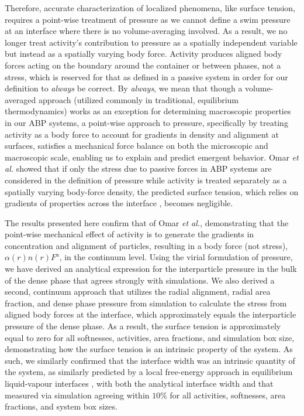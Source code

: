 \documentclass[twoside,twocolumn,9pt]{article}
\begin{document}
Therefore, accurate characterization of localized phenomena, like surface tension, requires a point-wise treatment of pressure as we cannot define a swim pressure at an interface where there is no volume-averaging involved. As a result, we no longer treat activity's contribution to pressure as a spatially independent variable but instead as a spatially varying body force. Activity produces aligned body forces acting on the boundary around the container or between phases, not a stress, which is reserved for that as defined in a passive system in order for our definition to \textit{always} be correct. By \textit{always}, we mean that though a volume-averaged approach (utilized commonly in traditional, equilibrium thermodynamics) works as an exception \cite{Solon2015a} for determining macroscopic properties in our ABP systems, a point-wise approach to pressure, specifically by treating activity as a body force to account for gradients in density and alignment at surfaces, satisfies a mechanical force balance on both the microscopic and macroscopic scale, enabling us to explain and predict emergent behavior. Omar \textit{et al.} showed that if only the stress due to passive forces in ABP systems are considered in the definition of pressure while activity is treated separately as a spatially varying body-force density, the predicted surface tension, which relies on gradients of properties across the interface \cite{Navascues1979}, becomes negligible. 

The results presented here confirm that of Omar \textit{et al.}, demonstrating that the point-wise mechanical effect of activity is to generate the gradients in concentration and alignment of particles, resulting in a body force (not stress), $\alpha(r) n(r) F^\text{a}$, in the continuum level. Using the virial formulation of pressure, we have derived an analytical expression for the interparticle pressure in the bulk of the dense phase that agrees strongly with simulations. We also derived a second, continuum approach that utilizes the radial alignment, radial area fraction, and dense phase pressure from simulation to calculate the stress from aligned body forces at the interface, which approximately equals the interparticle pressure of the dense phase. As a result, the surface tension is approximately equal to zero for all softnesses, activities, area fractions, and simulation box size, demonstrating how the surface tension is an intrinsic property of the system. As such, we similarly confirmed that the interface width was an intrinsic quantity of the system, as similarly predicted by a local free-energy approach in equilibrium liquid-vapour interfaces \cite{vanderwaal1979, Cahn1958, Fisk1969, Singh1977}, with both the analytical interface width and that measured via simulation agreeing within $10\%$ for all activities, softnesses, area fractions, and system box sizes.
\end{document}
